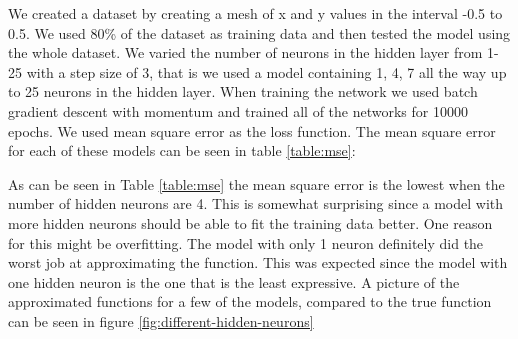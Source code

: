 \documentclass[a4paper]{article}
\begin{document}

We created a dataset by creating a mesh of x and y values in the interval -0.5 to 0.5. We used 80\% of the dataset as training data and then tested the model using the whole dataset. We varied the number of neurons in the hidden layer from 1-25 with a step size of 3, that is we used a model containing 1, 4, 7 all the way up to 25 neurons in the hidden layer. When training the network we used batch gradient descent with momentum and trained all of the networks for 10000 epochs. We used mean square error as the loss function. The mean square error for each of these models can be seen in table \ref{table:mse}:



As can be seen in Table \ref{table:mse} the mean square error is the lowest when the number of hidden neurons are 4. This is somewhat surprising since a model with more hidden neurons should be able to fit the training data better. One reason for this might be overfitting. The model with only 1 neuron definitely did the worst job at approximating the function. This was expected since the model with one hidden neuron is the one that is the least expressive. A picture of the approximated functions for a few of the models, compared to the true function can be seen in figure \ref{fig:different-hidden-neurons}
\end{document}
